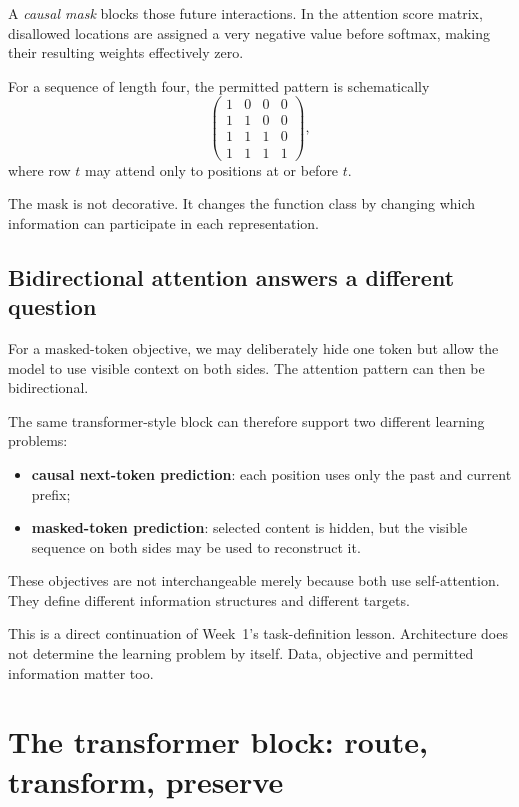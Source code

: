 A \emph{causal mask} blocks those future interactions. In the attention score matrix, disallowed locations are assigned a very negative value before softmax, making their resulting weights effectively zero.

For a sequence of length four, the permitted pattern is schematically
\[
\begin{pmatrix}
1 & 0 & 0 & 0\\
1 & 1 & 0 & 0\\
1 & 1 & 1 & 0\\
1 & 1 & 1 & 1
\end{pmatrix},
\]
where row \(t\) may attend only to positions at or before \(t\).

The mask is not decorative. It changes the function class by changing which information can participate in each representation.

\subsection{Bidirectional attention answers a different question}

For a masked-token objective, we may deliberately hide one token but allow the model to use visible context on both sides. The attention pattern can then be bidirectional.

The same transformer-style block can therefore support two different learning problems:
\begin{itemize}[leftmargin=*]
  \item \textbf{causal next-token prediction}: each position uses only the past and current prefix;
  \item \textbf{masked-token prediction}: selected content is hidden, but the visible sequence on both sides may be used to reconstruct it.
\end{itemize}

These objectives are not interchangeable merely because both use self-attention. They define different information structures and different targets.

This is a direct continuation of Week~1's task-definition lesson. Architecture does not determine the learning problem by itself. Data, objective and permitted information matter too.

\section{The transformer block: route, transform, preserve}

